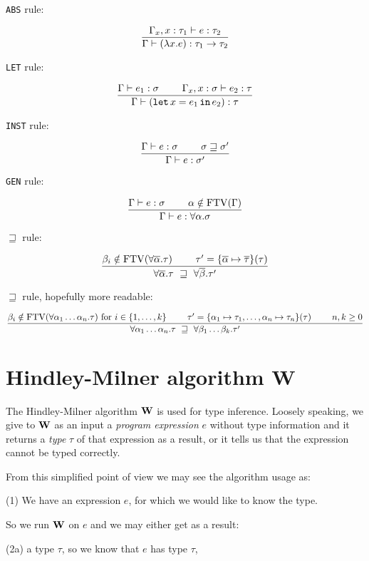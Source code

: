 \documentclass[a4paper,oneside]{memoir}
\begin{document}
\texttt{ABS} rule:

$$\dfrac{\Gamma_x,x:\tau_1 \vdash e : \tau_2}{\Gamma \vdash (\lambda x . e) :  \tau_1 \rightarrow \tau_2}$$

\texttt{LET} rule:

$$\dfrac{\Gamma \vdash e_1 : \sigma ~ ~ ~ ~ ~ ~ ~ \Gamma_x,x:\sigma \vdash e_2 : \tau}{\Gamma \vdash (\texttt{let} \, x = e_1 \, \texttt{in} \, e_2) :  \tau}$$

\texttt{INST} rule:

$$\dfrac{\Gamma \vdash e : \sigma ~ ~ ~ ~ ~ ~ ~ \sigma \sqsupseteq \sigma^\prime}{\Gamma \vdash e : \sigma^\prime}$$

\texttt{GEN} rule:

$$\dfrac{\Gamma \vdash e : \sigma ~ ~ ~ ~ ~ ~ ~ \alpha \notin \operatorname{FTV}(\Gamma)}{\Gamma \vdash e : \forall \alpha . \sigma}$$

$\sqsupseteq$ rule:

$$\dfrac{\beta_i \notin \operatorname{FTV}(\forall \overline{\alpha}.\tau) ~ ~ ~ ~ ~ ~ ~ \tau^\prime = \{\overline{\alpha} \mapsto \overline{\tau}\}(\tau)}{\forall \overline{\alpha}.\tau  ~ \sqsupseteq ~   \forall \overline{\beta}.\tau^\prime}$$

$\sqsupseteq$ rule, hopefully more readable:

$$\dfrac{\beta_i \notin \operatorname{FTV}(\forall \alpha_1\dots\alpha_n.\tau) \text{ for } i \in \{1,\dots,k\} ~ ~ ~ ~ ~ ~ ~ \tau^\prime = \{ \alpha_1 \mapsto \tau_1,  \dots, \alpha_n \mapsto \tau_n \}(\tau) ~ ~ ~ ~ ~ ~ ~ n,k \geq 0}{\forall \alpha_1\dots\alpha_n.\tau  ~ \sqsupseteq ~   \forall \beta_1\dots\beta_k.\tau^\prime}$$



\section{Hindley-Milner algorithm W}

The Hindley-Milner algorithm $\operatorname{\textbf{W}}$ is used for type inference.
Loosely speaking, we give to $\operatorname{\textbf{W}}$ as an input 
a \textit{program expression} $e$ without type information 
and it returns a \textit{type} $\tau$ of that expression as a result, 
or it tells us that the expression cannot be typed correctly.

From this simplified point of view we may see the algorithm usage as:

(1) We have an expression $e$, for which we would like to know the type. 

So we run $\operatorname{\textbf{W}}$ on $e$ and we may either get as a result:

(2a) a type $\tau$, so we know that $e$ has type $\tau$,
\end{document}
